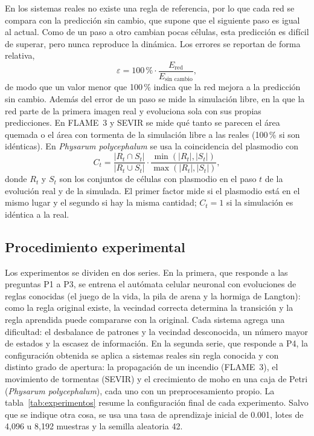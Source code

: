 En los sistemas reales no existe una regla de referencia, por lo que cada red se compara con la predicción sin cambio, que supone que el siguiente paso es igual al actual. Como de un paso a otro cambian pocas células, esta predicción es difícil de superar, pero nunca reproduce la dinámica. Los errores se reportan de forma relativa,
\begin{equation}
	\varepsilon = 100\,\% \cdot \frac{E_{\text{red}}}{E_{\text{sin cambio}}},
	\label{eq:error_relativo}
\end{equation}
de modo que un valor menor que 100\,\% indica que la red mejora a la predicción sin cambio. Además del error de un paso se mide la simulación libre, en la que la red parte de la primera imagen real y evoluciona sola con sus propias predicciones. En FLAME~3 y SEVIR se mide qué tanto se parecen el área quemada o el área con tormenta de la simulación libre a las reales (100\,\% si son idénticas). En \textit{Physarum polycephalum} se usa la coincidencia del plasmodio con
\begin{equation}
	C_t = \frac{|R_t \cap S_t|}{|R_t \cup S_t|} \cdot \frac{\min(|R_t|, |S_t|)}{\max(|R_t|, |S_t|)},
	\label{eq:coincidencia}
\end{equation}
donde $R_t$ y $S_t$ son los conjuntos de células con plasmodio en el paso $t$ de la evolución real y de la simulada. El primer factor mide si el plasmodio está en el mismo lugar y el segundo si hay la misma cantidad; $C_t = 1$ si la simulación es idéntica a la real.

\subsection{Procedimiento experimental}

Los experimentos se dividen en dos series. En la primera, que responde a las preguntas P1 a P3, se entrena el autómata celular neuronal con evoluciones de reglas conocidas (el juego de la vida, la pila de arena y la hormiga de Langton): como la regla original existe, la vecindad correcta determina la transición y la regla aprendida puede compararse con la original. Cada sistema agrega una dificultad: el desbalance de patrones y la vecindad desconocida, un número mayor de estados y la escasez de información. En la segunda serie, que responde a P4, la configuración obtenida se aplica a sistemas reales sin regla conocida y con distinto grado de apertura: la propagación de un incendio (FLAME~3), el movimiento de tormentas (SEVIR) y el crecimiento de moho en una caja de Petri (\textit{Physarum polycephalum}), cada uno con un preprocesamiento propio. La tabla~\ref{tab:experimentos} resume la configuración final de cada experimento. Salvo que se indique otra cosa, se usa una tasa de aprendizaje inicial de 0.001, lotes de 4,096 u 8,192 muestras y la semilla aleatoria 42.

